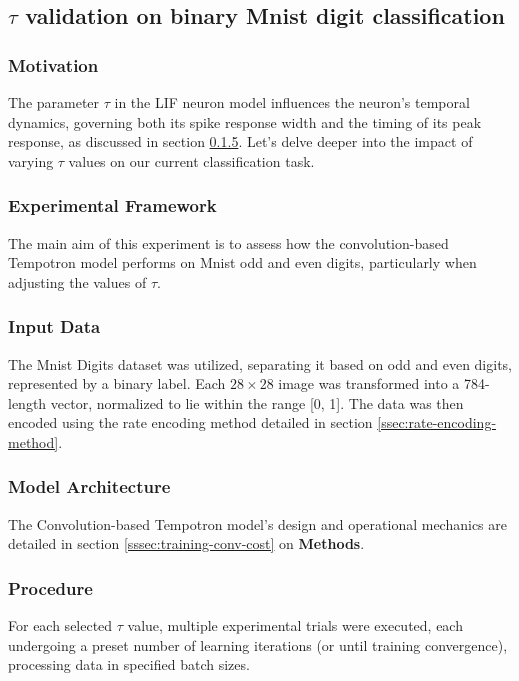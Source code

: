 \subsection{$\tau$ validation on binary Mnist digit classification}

\subsubsection{Motivation}

The parameter \(\tau\) in the LIF neuron model influences the neuron's temporal dynamics, governing both its spike response width and the timing of its peak response, as discussed in section \ref{}. 
Let's delve deeper into the impact of varying \(\tau\) values on our current classification task.


\subsubsection{Experimental Framework}

The main aim of this experiment is to assess how the convolution-based Tempotron model performs on Mnist odd and even digits, particularly when adjusting the values of $\tau$.

\subsubsection{Input Data}

The Mnist Digits dataset was utilized, separating it based on odd and even digits, represented by a binary label. Each $28 \times 28$ image was transformed into a 784-length vector, normalized to lie within the range [0, 1]. The data was then encoded using the rate encoding method detailed in section \ref{ssec:rate-encoding-method}.


\subsubsection{Model Architecture}

The Convolution-based Tempotron model's design and operational mechanics are detailed in section \ref{sssec:training-conv-cost} on \textbf{Methods}.


\subsubsection{Procedure}

For each selected $\tau$ value, multiple experimental trials were executed, each undergoing a preset number of learning iterations (or until training convergence), processing data in specified batch sizes.

